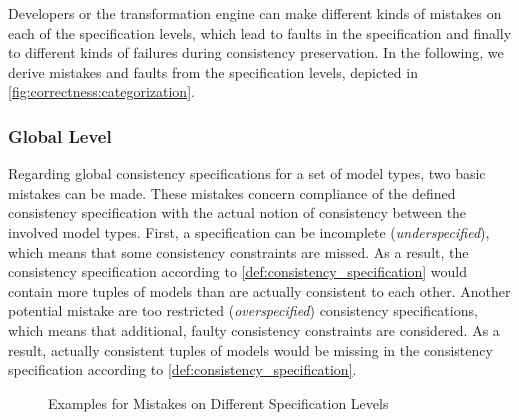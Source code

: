 Developers or the transformation engine can make different kinds of mistakes on each of the specification levels, which lead to faults in the specification and finally to different kinds of failures during consistency preservation.
In the following, we derive mistakes and faults from the specification levels, depicted in \autoref{fig:correctness:categorization}.

\subsubsection{Global Level}
Regarding global consistency specifications for a set of model types, two basic mistakes can be made. 
These mistakes concern compliance of the defined consistency specification with the actual notion of consistency between the involved model types.
First, a specification can be incomplete (\emph{underspecified}), which means that some consistency constraints are missed. 
As a result, the consistency specification according to \autoref{def:consistency_specification} would contain more tuples of models than are actually consistent to each other. 
Another potential mistake are too restricted (\emph{overspecified}) consistency specifications, which means that additional, faulty consistency constraints are considered. 
As a result, actually consistent tuples of models would be missing in the consistency specification according to \autoref{def:consistency_specification}. 

\begin{figure}[bt]
    \centering
    
    \caption{Examples for Mistakes on Different Specification Levels}
    \label{fig:correctness:mistakes_specification_levels}
\end{figure}

